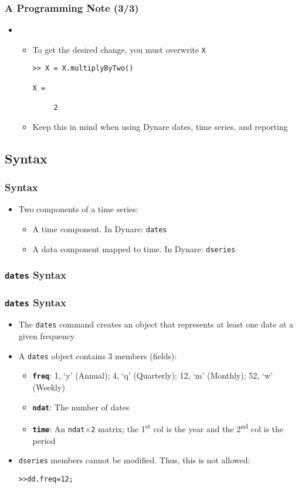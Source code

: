 \documentclass[10pt]{beamer}
\newcommand{\myitem}{\item[$\bullet$]}
\begin{document}
\begin{frame}[fragile,t]
  \frametitle{A Programming Note (3/3)}
  \begin{itemize}
    \item[] \begin{itemize}
    \myitem To get the desired change, you must overwrite \texttt{X}
\begin{verbatim}
>> X = X.multiplyByTwo()

X =

     2
\end{verbatim}
\myitem Keep this in mind when using Dynare dates, time series, and reporting
  \end{itemize}
  \end{itemize}
\end{frame}


\subsection{Syntax}
\begin{frame}[fragile,t]
  \frametitle{Syntax}
  \begin{itemize}
  \myitem Two components of a time series:
    \begin{itemize}
    \myitem A time component. In Dynare: \texttt{dates}
    \myitem A data component mapped to time. In Dynare: \texttt{dseries}
    \end{itemize}
  \end{itemize}
\end{frame}

\subsubsection{\texttt{dates} Syntax}
\begin{frame}[fragile,t]
  \frametitle{\texttt{dates} Syntax}
  \begin{itemize}
    \myitem The \texttt{dates} command creates an object that represents at least one date at a given frequency
    \myitem A \texttt{dates} object contains 3 members (fields):
    \begin{itemize}
      \myitem{\textbf{\texttt{freq}}}: 1, `y' (Annual); 4, `q' (Quarterly); 12, `m' (Monthly); 52, `w' (Weekly)
      \myitem{\textbf{\texttt{ndat}}}: The number of dates
      \myitem{\textbf{\texttt{time}}}: An \texttt{ndat$\times$2} matrix; the 1\textsuperscript{st} col is the year and the 2\textsuperscript{nd} col is the period
    \end{itemize}
    \myitem \texttt{dseries} members cannot be modified. Thus, this is not allowed:
\begin{alltt}
  >> dd.freq = 12;
\end{alltt}
  \end{itemize}
\end{frame}
\end{document}
